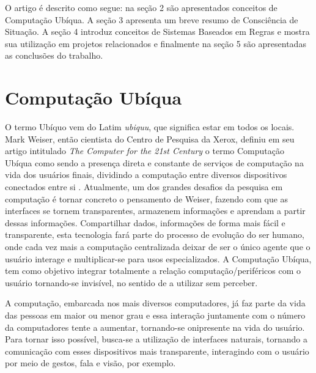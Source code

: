 \documentclass[12pt,a4paper,compsoc]{IEEEtran}
\begin{document}
  O artigo é descrito como segue: na seção 2 são apresentados conceitos de Computação Ubíqua. A
  seção 3 apresenta um breve resumo de Consciência de Situação. A seção 4 introduz conceitos de
  Sistemas Baseados em Regras e mostra sua utilização em projetos relacionados e finalmente na
  seção 5 são apresentadas as conclusões do trabalho.


\section{Computação Ubíqua}

  O termo Ubíquo vem do Latim \textit{ubiquu}, que significa estar em todos os locais. Mark Weiser,
  então cientista do Centro de Pesquisa da Xerox, definiu em seu artigo intitulado  \textit{The
  Computer for the 21st Century} o termo Computação Ubíqua como sendo a presença direta e constante
  de serviços de computação na vida dos usuários finais, dividindo a computação entre diversos
  dispositivos conectados entre si \cite{weiser1991}. Atualmente, um dos grandes desafios da
  pesquisa em computação é tornar concreto o pensamento de Weiser, fazendo com que as interfaces se
  tornem transparentes, armazenem informações e aprendam a partir dessas informações. Compartilhar
  dados, informações de forma mais fácil e transparente, esta tecnologia fará parte do processo de
  evolução do ser humano, onde cada vez mais a computação centralizada deixar de ser o único agente
  que o usuário interage e multiplicar-se para usos especializados. A Computação Ubíqua,  tem como
  objetivo integrar totalmente a relação computação/periféricos com o usuário tornando-se
  invisível, no sentido de a utilizar sem perceber.
  
  A computação, embarcada nos mais diversos computadores, já faz parte da vida das pessoas em maior
  ou menor grau e essa interação juntamente com o número da computadores tente a aumentar,
  tornando-se onipresente na vida do usuário. Para tornar isso possível, busca-se a utilização de
  interfaces naturais, tornando a comunicação com esses dispositivos mais transparente, interagindo
  com o usuário por meio de gestos, fala e visão, por exemplo.
  
\end{document}
